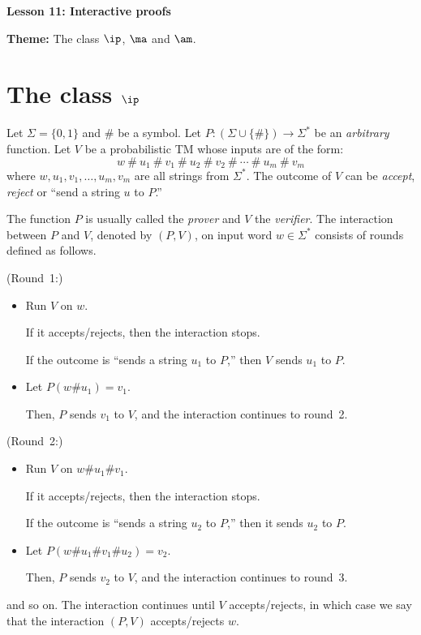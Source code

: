 \documentclass[11pt, a4paper]{article}
\renewcommand{\lesson}{11}
\renewcommand{\lessontitle}{Interactive proofs}
\renewcommand{\fulltitle}{Lesson \lesson: \lessontitle}
\begin{document}
\date{}



\begin{center}
{\Large {\bf \fulltitle}}
\end{center}
\vspace{0.5cm}

\noindent
{\bf Theme:} The class $\ip$, $\ma$ and $\am$.

\section{The class $\ip$}

Let $\Sigma=\{0,1\}$ and $\#$ be a symbol.
Let $P:(\Sigma\cup\{\#\})\to\Sigma^*$ be an {\em arbitrary} function.
Let $V$ be a probabilistic TM whose inputs are of the form:
$$
w\ \#\ u_1\ \#\ v_1\ \#\ u_2\ \# \ v_2\ \#\ \cdots \ \# \ u_{m}\ \# \ v_{m} 
$$
where $w,u_1,v_1,\ldots,u_m,v_m$ are all strings from $\Sigma^*$.
The outcome of $V$ can be {\em accept}, {\em reject} or ``send a string $u$ to $P$.''

The function $P$ is usually called the {\em prover} and $V$ the {\em verifier}.
The interaction between $P$ and $V$, denoted by $(P,V)$, on input word $w\in \Sigma^*$ consists of rounds defined as follows.

\vspace{0.3cm}
\noindent
(Round~1:)
\begin{itemize}
\item
Run $V$ on $w$.

If it accepts/rejects, then the interaction stops.

If the outcome is ``sends a string $u_1$ to $P$,''
then $V$ sends $u_1$ to $P$.

\item 
Let $P(w\#u_1)=v_1$.

Then, $P$ sends $v_1$ to $V$, and the interaction continues to round~2.
\end{itemize}
(Round~2:)
\begin{itemize}
\item
Run $V$ on $w\#u_1\#v_1$.

If it accepts/rejects, then the interaction stops.

If the outcome is ``sends a string $u_2$ to $P$,''
then it sends $u_2$ to $P$.

\item 
Let $P(w\#u_1\#v_1\#u_2)=v_2$.

Then, $P$ sends $v_2$ to $V$, and the interaction continues to round~3.
\end{itemize}
and so on. The interaction continues until $V$ accepts/rejects, in which case
we say that the interaction $(P,V)$ accepts/rejects $w$.
\end{document}
